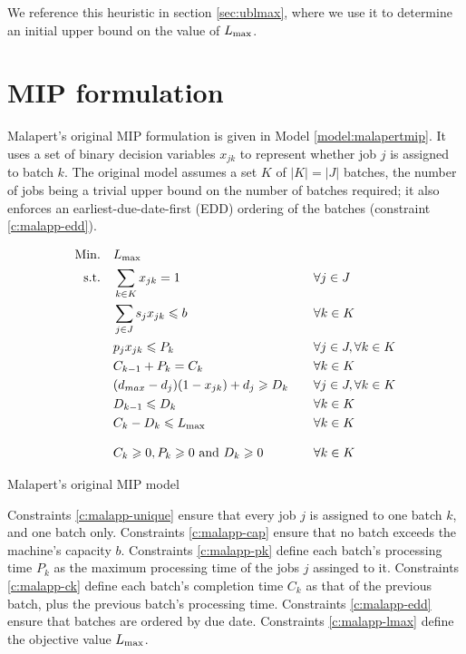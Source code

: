 \documentclass[13pt, letterpaper, oneside]{book}
\begin{document}
We reference this heuristic in section \ref{sec:ublmax}, where we use it to
determine an initial upper bound on the value of $L_{\text{max}}$.

\section{MIP formulation}
Malapert's original MIP formulation is given in Model \ref{model:malapertmip}. It
uses a set of binary decision variables $x_{jk}$ to represent whether job $j$ is
assigned to batch $k$. The original model assumes a set $K$ of $|K| = |J|$
batches, the number of jobs being a trivial upper bound on the number of batches
required; it also enforces an earliest-due-date-first (EDD) ordering of the
batches (constraint \eqref{c:malapp-edd}).

\begin{model}[h]
\begin{alignat}{2}
\mathrm{Min.}\quad & L_{\text{max}} && \\
\mathrm{s.t.}\quad &\sum_{k \in K} x_{jk} = 1 \quad && \forall j \in J
\label{c:malapp-unique}\\
  &\sum_{j \in J} s_j x_{jk} \leqslant b \quad && \forall k \in K\label{c:malapp-cap}\\
  &p_j x_{jk} \leqslant P_k \quad && \forall j \in J, \forall k \in
  K\label{c:malapp-pk}\\
  &C_{k-1} + P_{k} = C_k \quad && \forall k \in K\label{c:malapp-ck}\\
  &(d_{max} - d_j)(1 - x_{jk}) + d_j \geqslant D_k \quad && \forall j \in J, \forall
  k \in K\label{c:malapp-dk}\\
  &D_{k-1} \leqslant D_k \quad && \forall k \in K \label{c:malapp-edd} \\
  &C_k - D_k \leqslant L_{\text{max}} \quad && \forall k \in K\label{c:malapp-lmax}\\[2ex]
  &C_k \geqslant 0, P_k \geqslant 0 \text{ and } D_k \geqslant 0 \quad && \forall k \in K  
\end{alignat}
\caption{Malapert's original MIP model}
\label{model:malapertmip}
\end{model}

Constraints \eqref{c:malapp-unique} ensure that every job $j$ is assigned to
one batch $k$, and one batch only. Constraints \eqref{c:malapp-cap} ensure that
no batch exceeds the machine's capacity $b$. Constraints \eqref{c:malapp-pk}
define each batch's processing time $P_k$ as the maximum processing time of the
jobs $j$ assinged to it. Constraints \eqref{c:malapp-ck} define each batch's
completion time $C_k$ as that of the previous batch, plus the previous batch's
processing time. Constraints \eqref{c:malapp-edd} ensure that batches are
ordered by due date. Constraints \eqref{c:malapp-lmax} define the objective
value $L_{\text{max}}$.
\end{document}
